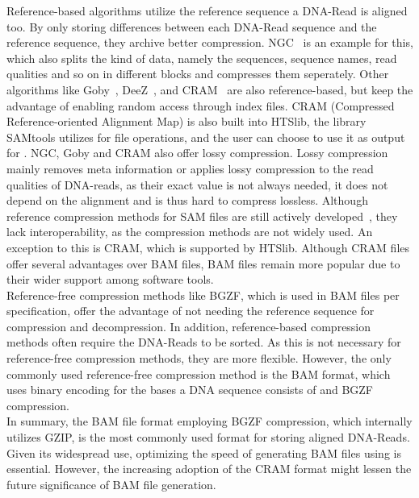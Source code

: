 Reference-based algorithms utilize the reference sequence a DNA-Read is aligned too. By only storing differences between each DNA-Read sequence and the reference sequence, they archive better compression. NGC~\cite{popitsch_ngc_2013} is an example for this, which also splits the kind of data, namely the sequences, sequence names, read qualities and so on in different blocks and compresses them seperately. Other algorithms like Goby~\cite{campagne_compression_2013}, DeeZ~\cite{hach_deez_2014}, and CRAM~\cite{fritz_efficient_2011} are also reference-based, but keep the advantage of enabling random access through index files. CRAM (Compressed Reference-oriented Alignment Map) is also built into HTSlib, the library SAMtools utilizes for file operations, and the user can choose to use it as output for \sort. NGC, Goby and CRAM also offer lossy compression. Lossy compression mainly removes meta information or applies lossy compression to the read qualities of DNA-reads, as their exact value is not always needed, it does not depend on the alignment and is thus hard to compress lossless. Although reference compression methods for SAM files are still actively developed~\cite{banerjee_abridge_2022}, they lack interoperability, as the compression methods are not widely used. An exception to this is CRAM, which is supported by HTSlib. Although CRAM files offer several advantages over BAM files, BAM files remain more popular due to their wider support among software tools.\\

Reference-free compression methods like BGZF, which is used in BAM files per specification, offer the advantage of not needing the reference sequence for compression and decompression. In addition, reference-based compression methods often require the DNA-Reads to be sorted. As this is not necessary for reference-free compression methods, they are more flexible. However, the only commonly used reference-free compression method is the BAM format, which uses binary encoding for the bases a DNA sequence consists of and BGZF compression. \\

In summary, the BAM file format employing BGZF compression, which internally utilizes GZIP, is the most commonly used format for storing aligned DNA-Reads. Given its widespread use, optimizing the speed of generating BAM files using \sort is essential. However, the increasing adoption of the CRAM format might lessen the future significance of BAM file generation.

